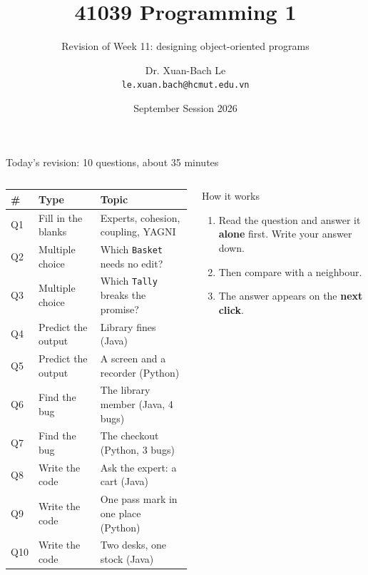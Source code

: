 \documentclass[aspectratio=169]{beamer}
\title[41039 Programming 1 --- Revision of Week 11]{41039 Programming 1}
\subtitle{Revision of Week 11: designing object-oriented programs}
\author{Dr. Xuan-Bach Le\\ \small\texttt{le.xuan.bach@hcmut.edu.vn}}
\institute{\small Faculty of Computer Science and Engineering, HCMUT}
\date{September Session 2026}
\newcommand{\code}[1]{\texttt{#1}}
\begin{document}
\begin{frame}[plain]
  \titlepage
\end{frame}

\begin{frame}{Today's revision: 10 questions, about 35 minutes}
  \begin{columns}[T,onlytextwidth]
    {\small
    \renewcommand{\arraystretch}{1.18}
    \begin{tabular}{@{}l@{\hspace{0.8em}}l@{\hspace{0.8em}}l@{}}
      \toprule
      \textbf{\#} & \textbf{Type} & \textbf{Topic}\\
      \midrule
      Q1  & Fill in the blanks & Experts, cohesion, coupling, YAGNI\\
      Q2  & Multiple choice    & Which \code{Basket} needs no edit?\\
      Q3  & Multiple choice    & Which \code{Tally} breaks the promise?\\
      Q4  & Predict the output & Library fines (Java)\\
      Q5  & Predict the output & A screen and a recorder (Python)\\
      Q6  & Find the bug       & The library member (Java, 4 bugs)\\
      Q7  & Find the bug       & The checkout (Python, 3 bugs)\\
      Q8  & Write the code     & Ask the expert: a cart (Java)\\
      Q9  & Write the code     & One pass mark in one place (Python)\\
      Q10 & Write the code     & Two desks, one stock (Java)\\
      \bottomrule
    \end{tabular}}
    \begin{discussionbox}{How it works}
      \small\raggedright
      \begin{enumerate}[itemsep=0.3em, topsep=0.1em, leftmargin=1.2em]
        \item Read the question and answer it \textbf{alone} first. Write your answer
              down.
        \item Then compare with a neighbour.
        \item The answer appears on the \textbf{next click}.
      \end{enumerate}
    \end{discussionbox}
  \end{columns}
\end{frame}
\end{document}
